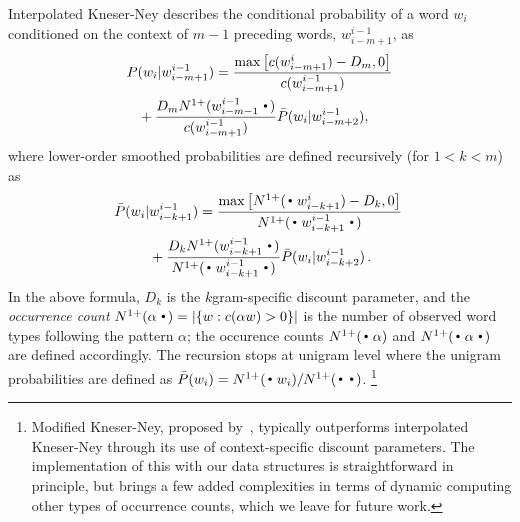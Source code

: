 Interpolated Kneser-Ney describes the conditional probability of a word $w_i$ conditioned on the context of $m-1$ preceding words, $w_{i-m+1}^{i-1}$, as 
\begin{align}
P(w_i |& w_{i-m+1}^{i-1})=\frac{\max\left[c(w^{i}_{i-m+1}) - D_m,0\right]}{c(w^{i-1}_{i-m+1})} \nonumber \\
& \hspace{-6mm} +\frac{D_m \nlplus{w^{i-1}_{i-m-1}\Bigcdot} }{c(w^{i-1}_{i-m+1})}  
\bar{P}(w_i | w_{i-m+2}^{i-1}) ,  
\label{eq:high}
\end{align}
where lower-order smoothed probabilities are defined recursively (for $1<k<m$) as 
\begin{align}
\! \bar{P}(w_i |& w_{i-k+1}^{i-1})
 = \frac{\max\left[\nlplus{\Bigcdot w_{i-k+1}^{i}} - D_k,0\right]}{\nlplus{\Bigcdot w_{i-k+1}^{i-1} \Bigcdot}} \nonumber \\
&+ \frac{D_k \nlplus{w_{i-k+1}^{i-1}\Bigcdot}}{\nlplus{\Bigcdot w_{i-k+1}^{i-1} \Bigcdot}} \bar{P}(w_i | w_{i-k+2}^{i-1}) \,  . \! \label{eq:mid}
\end{align}
In the above formula, $D_k$ is the $k$gram-specific discount parameter, and 
the \emph{occurrence count} 
\mbox{$\nlplus{\alpha\Bigcdot} = |\{w: c(\alpha w)>0\}|$} 
is the number of observed word types following the pattern $\alpha$; 
the occurence counts $\nlplus{\Bigcdot\alpha}$ and $\nlplus{\Bigcdot\alpha\Bigcdot}$ 
are defined accordingly.
The recursion stops at unigram level where the unigram probabilities are defined as
%
$ \bar{P}(w_i) = \nlplus{\Bigcdot w_i} / \nlplus{\Bigcdot\Bigcdot}$.%
\footnote{Modified Kneser-Ney, proposed
  by~, typically outperforms interpolated
  Kneser-Ney through its use of context-specific discount parameters.
The implementation of this with our data structures is straightforward in principle, but brings a few added complexities in terms of dynamic computing other types of occurrence counts, which we leave for future work.}


